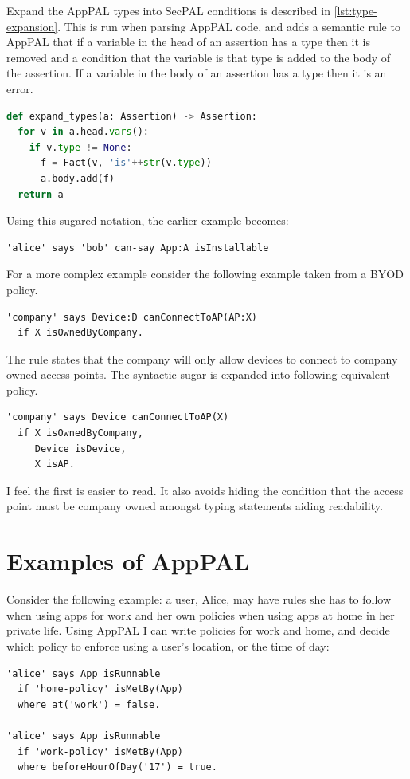 \documentclass[thesis.tex]{subfiles}
\begin{document}
Expand the AppPAL types into SecPAL conditions is described in \autoref{lst:type-expansion}.
This is run when parsing AppPAL code, and adds a semantic rule to AppPAL
  that if a variable in the head of an assertion has a type
  then it is removed and a condition that the variable is that type is added to the body of the assertion. 
If a variable in the body of an assertion has a type then it is an error.

\begin{lstlisting}[language=Python, float, caption={Procedure used to expand types from AppPAL into SecPAL.}, label={lst:type-expansion}]
def expand_types(a: Assertion) -> Assertion:
  for v in a.head.vars():
    if v.type != None:
      f = Fact(v, 'is'++str(v.type))
      a.body.add(f)
  return a
\end{lstlisting}

Using this sugared notation, the earlier example becomes:
\begin{lstlisting}
'alice' says 'bob' can-say App:A isInstallable
\end{lstlisting}

For a more complex example consider the following example taken from a BYOD policy.
\begin{lstlisting}
'company' says Device:D canConnectToAP(AP:X) 
  if X isOwnedByCompany.
\end{lstlisting}
The rule states that the company will only allow devices to connect to company owned access points.
The syntactic sugar is expanded into following equivalent policy.
\begin{lstlisting}
'company' says Device canConnectToAP(X) 
  if X isOwnedByCompany,
     Device isDevice,
     X isAP.
\end{lstlisting}
I feel the first is easier to read.
It also avoids hiding the condition that the access point must be company owned amongst typing statements aiding readability.


\section{Examples of AppPAL}

Consider the following example: a user, Alice, may have rules she has to follow
when using apps for work and her own policies when using apps at home in her
private life. Using AppPAL I can write policies for work and home, and decide
which policy to enforce using a user's location, or the time of day:

\begin{lstlisting}
'alice' says App isRunnable
  if 'home-policy' isMetBy(App)
  where at('work') = false.

'alice' says App isRunnable
  if 'work-policy' isMetBy(App)
  where beforeHourOfDay('17') = true.
\end{lstlisting}
\end{document}
